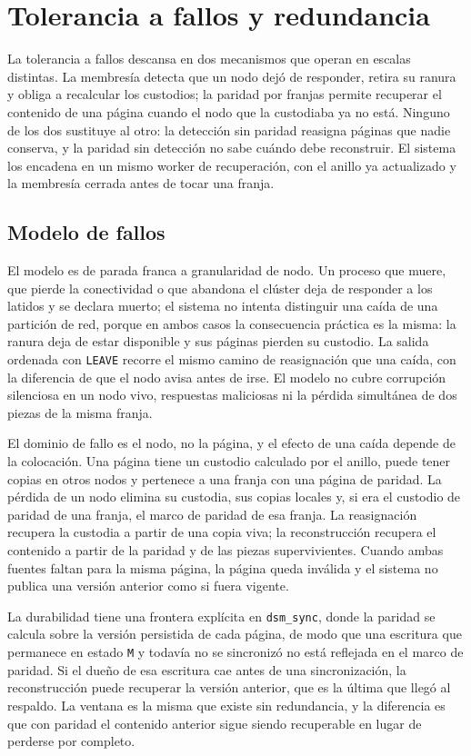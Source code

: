 \section{Tolerancia a fallos y redundancia}\label{sec:redundancia}

La tolerancia a fallos descansa en dos mecanismos que operan en escalas distintas. La membresía detecta que un nodo dejó de responder, retira su ranura y obliga a recalcular los custodios; la paridad por franjas permite recuperar el contenido de una página cuando el nodo que la custodiaba ya no está. Ninguno de los dos sustituye al otro: la detección sin paridad reasigna páginas que nadie conserva, y la paridad sin detección no sabe cuándo debe reconstruir. El sistema los encadena en un mismo worker de recuperación, con el anillo ya actualizado y la membresía cerrada antes de tocar una franja.

\subsection{Modelo de fallos}

El modelo es de parada franca a granularidad de nodo. Un proceso que muere, que pierde la conectividad o que abandona el clúster deja de responder a los latidos y se declara muerto; el sistema no intenta distinguir una caída de una partición de red, porque en ambos casos la consecuencia práctica es la misma: la ranura deja de estar disponible y sus páginas pierden su custodio. La salida ordenada con \texttt{LEAVE} recorre el mismo camino de reasignación que una caída, con la diferencia de que el nodo avisa antes de irse. El modelo no cubre corrupción silenciosa en un nodo vivo, respuestas maliciosas ni la pérdida simultánea de dos piezas de la misma franja.

El dominio de fallo es el nodo, no la página, y el efecto de una caída depende de la colocación. Una página tiene un custodio calculado por el anillo, puede tener copias en otros nodos y pertenece a una franja con una página de paridad. La pérdida de un nodo elimina su custodia, sus copias locales y, si era el custodio de paridad de una franja, el marco de paridad de esa franja. La reasignación recupera la custodia a partir de una copia viva; la reconstrucción recupera el contenido a partir de la paridad y de las piezas supervivientes. Cuando ambas fuentes faltan para la misma página, la página queda inválida y el sistema no publica una versión anterior como si fuera vigente.

La durabilidad tiene una frontera explícita en \texttt{dsm\_sync}, donde la paridad se calcula sobre la versión persistida de cada página, de modo que una escritura que permanece en estado \texttt{M} y todavía no se sincronizó no está reflejada en el marco de paridad. Si el dueño de esa escritura cae antes de una sincronización, la reconstrucción puede recuperar la versión anterior, que es la última que llegó al respaldo. La ventana es la misma que existe sin redundancia, y la diferencia es que con paridad el contenido anterior sigue siendo recuperable en lugar de perderse por completo.

